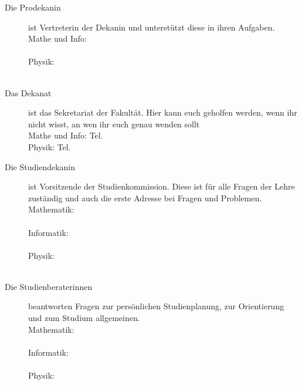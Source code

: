 \begin{description}
    \item[Die Prodekanin] ist Vertreterin der Dekanin und unterstützt diese in ihren Aufgaben.\\
    Mathe und Info: \prodekanmathe \\
    \email{\prodekanmatheemail} \\
    Physik: \prodekanphysik  \\
    \prodekanphysikAemail \\
    \email{\prodekanphysikBemail}

    \item[Das Dekanat] ist das Sekretariat der Fakultät. Hier kann euch geholfen werden, wenn ihr nicht wisst, an wen ihr euch genau wenden sollt\\
    Mathe und Info: Tel. \dekanatmathetelefon \\
    Physik: Tel.\dekanatphysiktelefon \\
    \email{\dekanatphysikemail}


    \item[Die Studiendekanin] ist Vorsitzende der Studienkommission. Diese ist für alle Fragen der Lehre zuständig und auch die erste Adresse bei Fragen und Problemen.\\
    Mathematik: \studiendekanmathe \\
    \email{\studiendekanmatheemail} \\
    Informatik: \studiendekaninformatik \\
    \email{\studiendekaninformatikemail} \\
    Physik: \studiendekanphysik \\
    \email{\studiendekanphysikemail} \\

    \item[Die Studienberaterinnen] beantworten Fragen zur persönlichen Studienplanung, zur Orientierung und zum Studium allgemeinen.\\
    Mathematik: \studienberatungmathe \\
    \email{\studienberatungmatheemail} \\
    Informatik: \studienberatunginformatik\\
    \email{\studienberatunginformatikemail} \\
    Physik: \studienberatungphysikersti\\
    \email{\studienberatungphysikemail}\\




\end{description}

